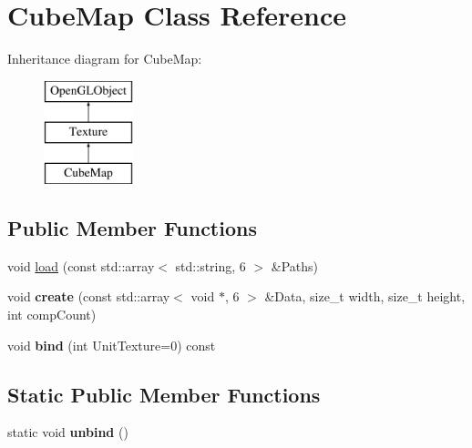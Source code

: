 \hypertarget{class_cube_map}{\section{Cube\+Map Class Reference}
\label{class_cube_map}
}
Inheritance diagram for Cube\+Map\+:\begin{figure}[H]
\begin{center}
\leavevmode
\includegraphics[height=3.000000cm]{class_cube_map}
\end{center}
\end{figure}
\subsection*{Public Member Functions}
\begin{DoxyCompactItemize}
\item 
void \hyperlink{class_cube_map_a0b1e25c2b88f8f32f4c137a8e0ca9cc2}{load} (const std\+::array$<$ std\+::string, 6 $>$ \&Paths)
\item 
\hypertarget{class_cube_map_ab2362f1c3487e918995adec3e6100762}{void {\bfseries create} (const std\+::array$<$ void $\ast$, 6 $>$ \&Data, size\+\_\+t width, size\+\_\+t height, int comp\+Count)}\label{class_cube_map_ab2362f1c3487e918995adec3e6100762}

\item 
\hypertarget{class_cube_map_acfaa0ac1c35bbbc0aa0ad7ab93b303c0}{void {\bfseries bind} (int Unit\+Texture=0) const }\label{class_cube_map_acfaa0ac1c35bbbc0aa0ad7ab93b303c0}

\end{DoxyCompactItemize}
\subsection*{Static Public Member Functions}
\begin{DoxyCompactItemize}
\item 
\hypertarget{class_cube_map_a744cf80626f1b59deb66077751e03083}{static void {\bfseries unbind} ()}\label{class_cube_map_a744cf80626f1b59deb66077751e03083}

\end{DoxyCompactItemize}

